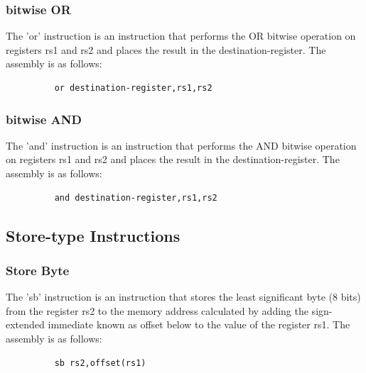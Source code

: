 \subsubsection{bitwise OR}
\qquad
The 'or' instruction is an instruction that performs the OR bitwise operation on registers rs1 and rs2 and places the result in the destination-register. The assembly is as follows:
\begin{figure}[!htbp]
    \centering
    \begin{verbatim}
    or destination-register,rs1,rs2
    \end{verbatim}
\end{figure}\newline

\subsubsection{bitwise AND}
\qquad
The 'and' instruction is an instruction that performs the AND bitwise operation on registers rs1 and rs2 and places the result in the destination-register. The assembly is as follows:
\begin{figure}[!htbp]
    \centering
    \begin{verbatim}
    and destination-register,rs1,rs2
    \end{verbatim}
\end{figure}\newline


\subsection{Store-type Instructions}

\subsubsection{Store Byte}
\qquad
The 'sb' instruction is an instruction that stores the least significant byte (8 bits) from the register rs2 to the memory address calculated by adding the sign-extended immediate known as offset below to the value of the register rs1. The assembly is as follows:
\begin{figure}[!htbp]
    \centering
    \begin{verbatim}
    sb rs2,offset(rs1)
    \end{verbatim}
\end{figure}\newline

